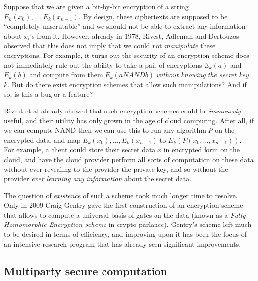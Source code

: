Suppose that we are given a bit-by-bit encryption of a string
\(E_k(x_0),\ldots,E_k(x_{n-1})\). By design, these ciphertexts are
supposed to be ``completely unscrutable'' and we should not be able to
extract any information about \(x_i\)'s from it. However, already in
1978, Rivest, Adleman and Dertouzos observed that this does not imply
that we could not \emph{manipulate} these encryptions. For example, it
turns out the security of an encryption scheme does not immediately rule
out the ability to take a pair of encryptions \(E_k(a)\) and \(E_k(b)\)
and compute from them \(E_k(a \ensuremath{\mathit{NAND}} b)\)
\emph{without knowing the secret key \(k\)}. But do there exist
encryption schemes that allow such manipulations? And if so, is this a
bug or a feature?

Rivest et al already showed that such encryption schemes could be
\emph{immensely} useful, and their utility has only grown in the age of
cloud computing. After all, if we can compute NAND then we can use this
to run any algorithm \(P\) on the encrypted data, and map
\(E_k(x_0),\ldots,E_k(x_{n-1})\) to \(E_k(P(x_0,\ldots,x_{n-1}))\). For
example, a client could store their secret data \(x\) in encrypted form
on the cloud, and have the cloud provider perform all sorts of
computation on these data without ever revealing to the provider the
private key, and so without the provider \emph{ever learning any
information} about the secret data.

The question of \emph{existence} of such a scheme took much longer time
to resolve. Only in 2009 Craig Gentry gave the first construction of an
encryption scheme that allows to compute a universal basis of gates on
the data (known as a \emph{Fully Homomorphic Encryption scheme} in
crypto parlance). Gentry's scheme left much to be desired in terms of
efficiency, and improving upon it has been the focus of an intensive
research program that has already seen significant improvements.

\subsection{Multiparty secure
computation}\label{Multiparty-secure-computa}

